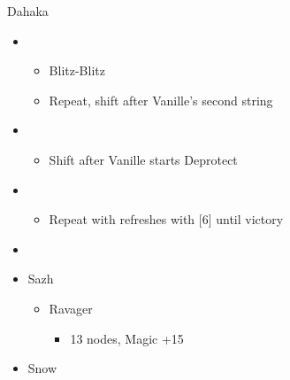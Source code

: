 \begin{multicols}{2}
\begin{battle}{Dahaka}
\begin{itemize}
\begin{itemize}
            \end{itemize}
      \item \second
            \begin{itemize}
              \item Blitz-Blitz
              \item Repeat, shift after Vanille's second string
            \end{itemize}
      \item \fifth
            \begin{itemize}
              \item Shift after Vanille starts Deprotect
            \end{itemize}
      \item \fourth
            \begin{itemize}
              \item Repeat with refreshes with [6] until victory
            \end{itemize}
    \end{itemize}
  \end{battle}
  \begin{menu}
    \begin{itemize}
      \paradigm
      \begin{itemize}
        \item {}%
              {}%
              {\paradigmline{(\rav)}{\rav}{\rav}}%
              {\paradigmline{\rav}{(\rav)}{(\med)}}%
              {\paradigmline{\com}{\com}{(\med)}}%
              {\paradigmline[5]{\textit{\rav}}{\textit{(\rav)}}{\textit{\sab}}}%
              {\paradigmline{\com}{\com}{\rav}}
      \end{itemize}
      \crystarium
      \begin{itemize}
        \item Sazh
              \begin{itemize}
                \item Ravager
                      \begin{itemize}
                        \item 13 nodes, Magic +15
                      \end{itemize}
              \end{itemize}
        \item Snow
              \begin{itemize}

\end{itemize}
\end{itemize}
\end{itemize}
\end{menu}
\end{multicols}
